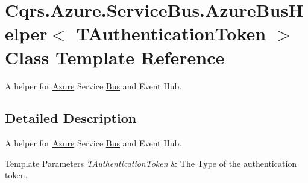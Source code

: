 \hypertarget{classCqrs_1_1Azure_1_1ServiceBus_1_1AzureBusHelper}{}\section{Cqrs.\+Azure.\+Service\+Bus.\+Azure\+Bus\+Helper$<$ T\+Authentication\+Token $>$ Class Template Reference}
\label{classCqrs_1_1Azure_1_1ServiceBus_1_1AzureBusHelper}


A helper for \hyperlink{namespaceCqrs_1_1Azure}{Azure} Service \hyperlink{namespaceCqrs_1_1Bus}{Bus} and Event Hub.  




\subsection{Detailed Description}
A helper for \hyperlink{namespaceCqrs_1_1Azure}{Azure} Service \hyperlink{namespaceCqrs_1_1Bus}{Bus} and Event Hub. 


\begin{DoxyTemplParams}{Template Parameters}
{\em T\+Authentication\+Token} & The Type of the authentication token.\\
\hline
\end{DoxyTemplParams}
